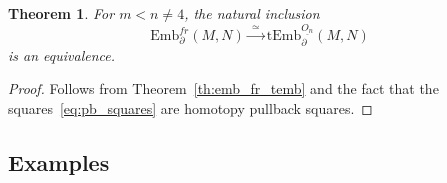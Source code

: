 \documentclass[11pt]{amsart}
\newtheorem{theorem}{Theorem}[section]
\theoremstyle{definition}
\newcommand{\Emb}{\mathrm{Emb}}
\newcommand{\tEmb}{\mathrm{tEmb}}
\newcommand{\hofiber}{\mathrm{hofiber}}
\newcommand{\fiber}{\mathrm{fiber}}
\numberwithin{equation}{section}
\begin{document}

\begin{theorem}\label{th:emb_fr_temb2}
For $m<n\neq 4$,  the natural inclusion
\[
\Emb_{\partial }^{fr}(M,N)\xrightarrow{\,\,\simeq\,\,} \tEmb_{\partial }^{\underline{O_{n}}}(M,N)
\]
is an equivalence.
\end{theorem}
\begin{proof}
Follows from Theorem~\ref{th:emb_fr_temb} and the fact that the squares~\eqref{eq:pb_squares} are homotopy pullback squares.
\end{proof}

\subsection{Examples}\label{ss:examples}
\end{document}
